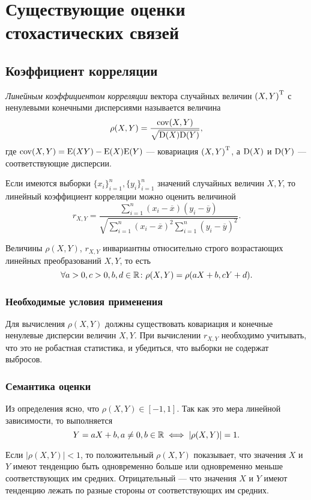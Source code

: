 \section*{Существующие оценки стохастических связей}
\subsection*{Коэффициент корреляции}

\begin{define}
\emph{Линейным коэффициентом корреляции} вектора случайных величин ${(X, Y)}^\mathrm{T}$ с ненулевыми конечными дисперсиями называется величина
\begin{equation}
	\rho(X, Y) = \frac{\mathrm{cov}(X, Y)}{\sqrt{\mathrm{D}(X)\mathrm{D}(Y)}},
\end{equation}
где $\mathrm{cov}(X, Y) = \mathrm{E}(XY) - \mathrm{E}(X)\mathrm{E}(Y)$ --- ковариация ${(X, Y)}^\mathrm{T}$, а $\mathrm{D}(X)$ и $\mathrm{D}(Y)$ --- соответствующие дисперсии.
\end{define}

Если имеются выборки $\{x_i\}_{i=1}^n, \{y_i\}_{i=1}^n$ значений случайных величин $X, Y$, то линейный коэффициент корреляции можно оценить величиной
\begin{equation}
r_{X, Y} = \frac{\sum_{i=1}^{n} (x_i - \overline{x})(y_i - \overline{y})}{\sqrt{\sum_{i=1}^{n} (x_i - \overline{x})^2 \sum_{i=1}^{n} (y_i - \overline{y})^2}}.
\end{equation}

Величины $\rho(X, Y)$, $r_{X, Y}$ инвариантны относительно строго возрастающих линейных преобразований $X, Y$, то есть
\[
\forall a > 0, c > 0, b, d \in \mathbb{R} \colon \rho(X, Y) = \rho(aX + b, cY + d).
\]

\subsubsection*{Необходимые условия применения}
Для вычисления $\rho(X, Y)$ должны существовать ковариация и конечные ненулевые дисперсии величин $X, Y$. При вычислении $r_{X, Y}$ необходимо учитывать, что это не робастная статистика, и убедиться, что выборки не содержат выбросов.
\subsubsection*{Семантика оценки}
Из определения ясно, что $\rho(X, Y) \in [-1, 1]$. Так как это мера линейной зависимости, то выполняется
\[
Y = aX + b, a \neq 0, b \in \mathbb{R} \iff |\rho(X, Y)| = 1.
\]

Если $|\rho(X, Y)| < 1$, то положительный $\rho(X, Y)$ показывает, что значения $X$ и $Y$ имеют тенденцию быть одновременно больше или одновременно меньше соответствующих им средних. Отрицательный --- что значения $X$ и $Y$ имеют тенденцию лежать по разные стороны от соответствующих им средних.

